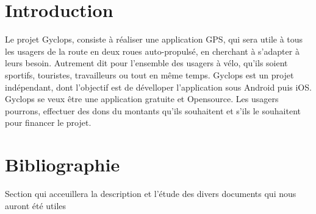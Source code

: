 \section{Introduction}
Le projet Gyclops, consiste à réaliser une application GPS, qui sera utile à tous
les usagers de la route en deux roues auto-propulsé, en cherchant à s'adapter à leurs besoin.
Autrement dit pour l'ensemble des usagers à vélo, qu'ils soient sportifs, touristes, travailleurs ou tout en même temps.
Gyclops est un projet indépendant, dont l'objectif est de dévelloper l'application sous Android puis iOS.
Gyclops se veux être une application gratuite et Opensource.
Les usagers pourrons, effectuer des dons du montants qu'ils souhaitent et s'ils le souhaitent
pour financer le projet.
\cite{refarticle}
\section{Bibliographie}
Section qui acceuillera la description et l'étude des divers documents qui nous auront
été utiles
